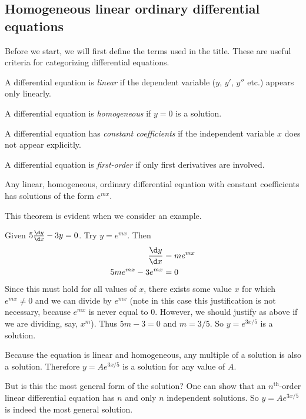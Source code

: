 \documentclass[a4paper]{article}
\begin{document}
\subsection{Homogeneous linear ordinary differential equations}
Before we start, we will first define the terms used in the title. These are useful criteria for categorizing differential equations.

\begin{defi}
  A differential equation is \emph{linear} if the dependent variable ($y$, $y'$, $y''$ etc.) appears only linearly.
\end{defi}

\begin{defi}
  A differential equation is \emph{homogeneous} if $y=0$ is a solution.
\end{defi}

\begin{defi}
  A differential equation has \emph{constant coefficients} if the independent variable $x$ does not appear explicitly.
\end{defi}

\begin{defi}
  A differential equation is \emph{first-order} if only first derivatives are involved.
\end{defi}

\begin{thm}
  Any linear, homogeneous, ordinary differential equation with constant coefficients has solutions of the form $e^{mx}$.
\end{thm}
This theorem is evident when we consider an example.
\begin{eg}
  Given $5\frac{\d y}{\d x} - 3y = 0$. Try $y = e^{mx}$. Then
  \begin{align*}
    \frac{\d y}{\d x} &= me^{mx}\\
    5me^{mx} - 3e^{mx} &= 0
  \end{align*}
  Since this must hold for all values of $x$, there exists some value $x$ for which $e^{mx} \not= 0$ and we can divide by $e^{mx}$ (note in this case this justification is not necessary, because $e^{mx}$ is never equal to 0. However, we should justify as above if we are dividing, say, $x^m$). Thus $5m - 3 = 0$ and $m = 3/5$. So $y = e^{3x/5}$ is a solution.

  Because the equation is linear and homogeneous, any multiple of a solution is also a solution. Therefore $y = Ae^{3x/5}$ is a solution for any value of $A$.

  But is this the most general form of the solution? One can show that an $n^\text{th}$-order linear differential equation has $n$ and only $n$ independent solutions. So $y = Ae^{3x/5}$ is indeed the most general solution.
\end{eg}
\end{document}
